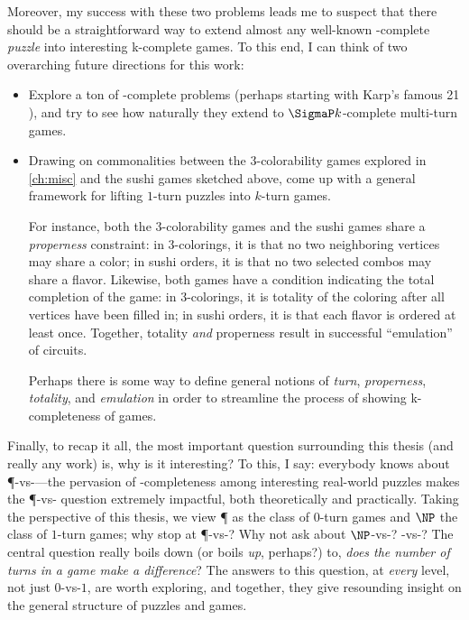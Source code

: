 Moreover, my success with these two problems leads me to suspect that there
should be a straightforward way to extend almost any well-known \NP-complete
\emph{puzzle} into interesting \SigmaP k-complete games.  To this end, I can
think of two overarching future directions for this work:
\begin{itemize}

  \item Explore a ton of \NP-complete problems (perhaps starting with Karp's
    famous 21 \citep{karp.np}), and try to see how naturally they extend to
    \(\SigmaP k\)-complete multi-turn games.

  \item Drawing on commonalities between the 3-colorability games explored in
    \cref{ch:misc} and the sushi games sketched above, come up with a general
    framework for lifting \(1\)-turn puzzles into \(k\)-turn games.

    For instance, both the 3-colorability games and the sushi games share a
    \emph{properness} constraint: in 3-colorings, it is that no two neighboring
    vertices may share a color; in sushi orders, it is that no two selected
    combos may share a flavor.  Likewise, both games have a condition indicating
    the total completion of the game: in 3-colorings, it is totality of the
    coloring after all vertices have been filled in; in sushi orders, it is that
    each flavor is ordered at least once.  Together, totality \emph{and}
    properness result in successful ``emulation'' of circuits.

    Perhaps there is some way to define general notions of \emph{turn},
    \emph{properness}, \emph{totality}, and \emph{emulation} in order to
    streamline the process of showing \SigmaP k-completeness of games.

\end{itemize}

Finally, to recap it all, the most important question surrounding this thesis
(and really any work) is, why is it interesting?  To this, I say: everybody
knows about \P-vs-\NP—the pervasion of \NP-completeness among interesting
real-world puzzles makes the \P-vs-\NP{} question extremely impactful, both
theoretically and practically.  Taking the perspective of this thesis, we view
\P{} as the class of \(0\)-turn games and \(\NP\) the class of \(1\)-turn games;
why stop at \P-vs-\NP?  Why not ask about \(\NP\)-vs-?
-vs-?  The central question really boils down (or boils
\emph{up}, perhaps?) to, \emph{does the number of turns in a game make a
difference}?  The answers to this question, at \emph{every} level, not just
\(0\)-vs-\(1\), are worth exploring, and together, they give resounding insight
on the general structure of puzzles and games.


%

